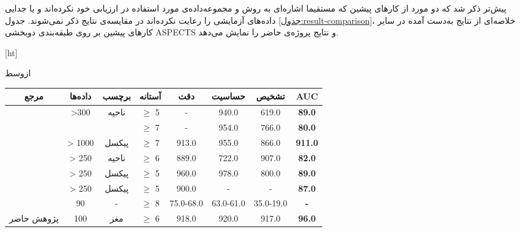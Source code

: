 پیش‌تر ذکر شد که دو مورد از کارهای پیشین که مستقیما اشاره‌ای به روش و مجموعه‌داده‌ی مورد استفاده در ارزیابی خود نکرده‌اند \cite{naganuma2021alberta} و یا جدایی داده‌های آزمایشی را رعایت نکرده‌اند \cite{golkonda2022automated} در مقایسه‌ی نتایج ذکر نمی‌شوند.
جدول \ref{جدول:result-comparison}، خلاصه‌ای از نتایج به‌دست آمده در سایر کارهای پیشین بر روی طبقه‌بندی دو‌بخشی ASPECTS و نتایج پروژه‌ی حاضر را نمایش می‌دهد.

[ht]

\vspace{1.5em}

‌ازوسط

    \begin{tabular}{cccccccc}
    \hline
    مرجع                                    & داده‌ها           & برچسب                     & آستانه‌ & دقت & حساسیت & تشخیص & \textbf{AUC}  \\ \hline
    \multirow{2}{*}{\cite{lee2023clinical}} & \multirow{2}{*}{>300} & \multirow{2}{*}{ناحیه} & $\geq$ 5              & -   & 940.0  & 619.0 & \textbf{89.0} \\ 
                                            &                       &                            & $\geq$ 7               & -   & 954.0  & 766.0 & \textbf{80.0} \\ 
    \cite{cao2022deep}                      & > 1000                &     پیکسل                 & $\geq$ 7               & 913.0 &955.0 & 866.0  & \textbf{911.0} \\ 
    \cite{chiang2022deep}                   & > 250                 &     ناحیه                 & $\geq$ 6               & 889.0 &722.0 & 907.0  & \textbf{82.0} \\ 
    \cite{kuang2019automated}               & > 250                 &     پیکسل                 & $\geq$ 5               & 960.0 &978.0 & 800.0  & \textbf{89.0} \\ 
    \cite{kuang2021eis}                     & > 250                 &     پیکسل                 & $\geq$ 5               & 900.0 &-    & -       & \textbf{87.0} \\
    \cite{yu2021automated}                  & 90                    & -                          & $\geq$ 8               & 75.0-68.0 &63.0-61.0  & 35.0-19.0 & \textbf{-} \\
    پژوهش حاضر                             & 100                   &     مغز                   & $\geq$ 6               & 918.0 &920.0    & 917.0  & \textbf{96.0} \\ \hline
    \end{tabular}

